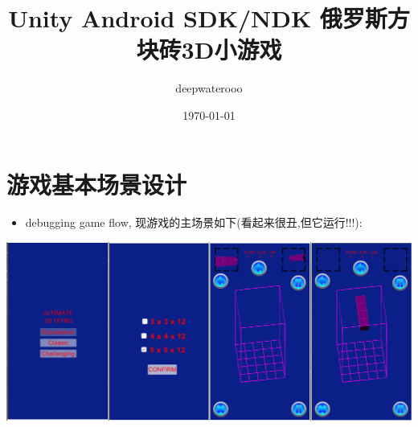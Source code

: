 \documentclass[9pt, b5paper]{article}
\author{deepwaterooo}
\date{\today}
\title{Unity Android SDK/NDK 俄罗斯方块砖3D小游戏}
\begin{document}
\maketitle
\tableofcontents


\section{游戏基本场景设计}
\label{sec-1}
\begin{itemize}
\item debugging game flow, 现游戏的主场景如下(看起来很丑,但它运行!!!):
\end{itemize}

\includegraphics[width=.9\linewidth]{./pic/readme_20221022_223927.png}
\end{document}
